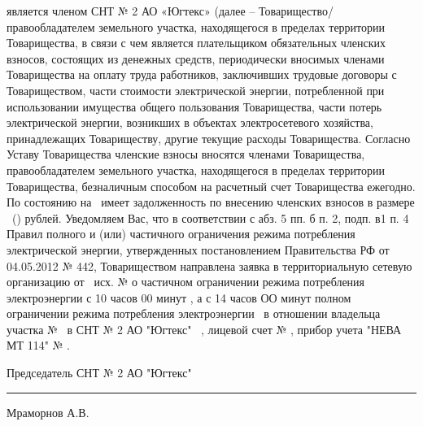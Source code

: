  является членом СНТ № 2 АО «Югтекс» (далее – Товарищество/ правообладателем земельного участка, находящегося в пределах территории Товарищества, в связи с чем является плательщиком обязательных членских взносов, состоящих из денежных средств, периодически вносимых членами Товарищества на оплату труда работников, заключивших трудовые договоры с Товариществом, части стоимости электрической энергии, потребленной при использовании имущества общего пользования Товарищества, части потерь электрической энергии, возникших в объектах электросетевого хозяйства, принадлежащих Товариществу, другие текущие расходы Товарищества. 
Согласно Уставу Товарищества членские взносы вносятся членами Товарищества, правообладателем земельного участка, находящегося в пределах территории Товарищества, безналичным способом на расчетный счет Товарищества ежегодно. 
По состоянию на  \   имеет задолженность по внесению членских взносов в размере   \ () рублей.
Уведомляем Вас, что в соответствии с абз. 5 пп. б п. 2, подп. в1 п. 4 Правил полного и (или) частичного ограничения режима потребления электрической энергии, утвержденных постановлением Правительства РФ от 04.05.2012 № 442,  Товариществом направлена заявка в территориальную сетевую организацию от  \ исх. №        о частичном ограничении режима потребления электроэнергии с 10 часов 00 минут    , а   с 14 часов ОО минут полном ограничении режима потребления электроэнергии     \ в отношении владельца участка №  \ в СНТ № 2 АО "Югтекс" \ , лицевой счет № , прибор учета "НЕВА МТ 114"  № . 

\vspace{15mm}

\noindent Председатель СНТ № 2 АО "Югтекс" \hfill    \rule{3cm}{0.1 mm}    Мраморнов А.В.

\pagebreak